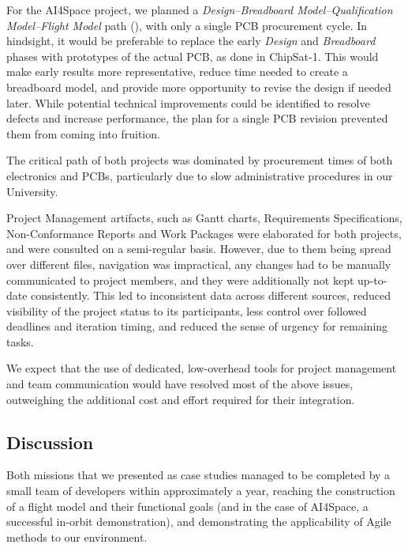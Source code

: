 \documentclass[journal,10pt]{IEEEtran}
\begin{document}
For the AI4Space project, we planned a \emph{Design--Breadboard Model--Qualification Model--Flight Model} path (), with only a single \ac{PCB} procurement cycle. In hindsight, it would be preferable to replace the early \emph{Design} and \emph{Breadboard} phases with prototypes of the actual \ac{PCB}, as done in ChipSat-1. This would make early results more representative, reduce time needed to create a breadboard model, and provide more opportunity to revise the design if needed later. While potential technical improvements could be identified to resolve defects and increase performance, the plan for a single \ac{PCB} revision prevented them from coming into fruition.



The critical path of both projects was dominated by procurement times of both electronics and \acsp{PCB}, particularly due to slow administrative procedures in our University.

Project Management artifacts, such as Gantt charts, Requirements Specifications, Non-Conformance Reports and Work Packages were elaborated for both projects, and were consulted on a semi-regular basis.
However, due to them being spread over different files, navigation was impractical, any changes had to be manually communicated to project members, and they were additionally not kept up-to-date consistently.
This led to inconsistent data across different sources, reduced visibility of the project status to its participants, less control over followed deadlines and iteration timing, and reduced the sense of urgency for remaining tasks.

We expect that the use of dedicated, low-overhead tools for project management and team communication would have resolved most of the above issues, outweighing the additional cost and effort required for their integration.


\subsection[Discussion]{Discussion}

\hspace{0pt}\par
Both missions that we presented as case studies managed to be completed by a small team of developers within approximately a year, reaching the construction of a flight model and their functional goals (and in the case of AI4Space, a successful in-orbit demonstration), and demonstrating the applicability of Agile methods to our environment.
\end{document}

